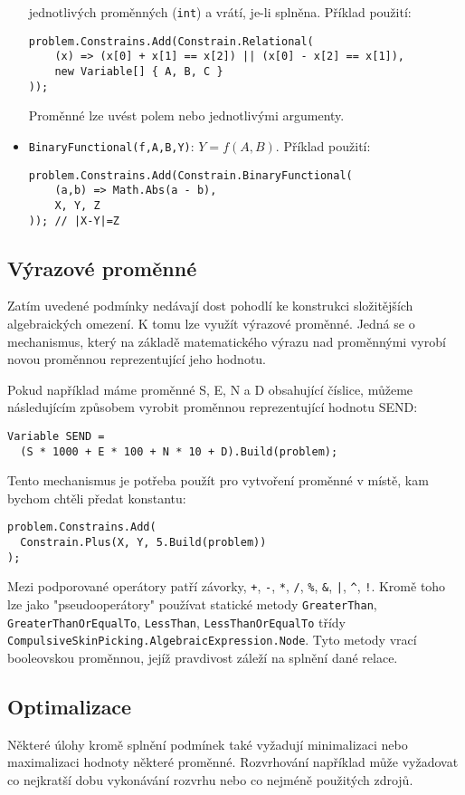 \documentclass[a4paper]{article}
\begin{document}
\begin{itemize}
	jednotlivých proměnných (\texttt{int}) a vrátí, je-li splněna.
	Příklad použití:
\begin{lstlisting}
problem.Constrains.Add(Constrain.Relational(
	(x) => (x[0] + x[1] == x[2]) || (x[0] - x[2] == x[1]),
	new Variable[] { A, B, C }
));
\end{lstlisting}
	Proměnné lze uvést polem nebo jednotlivými argumenty.
\item
	\texttt{BinaryFunctional(f,A,B,Y)}: $Y=f(A,B)$. Příklad použití:
\begin{lstlisting}
problem.Constrains.Add(Constrain.BinaryFunctional(
	(a,b) => Math.Abs(a - b),
	X, Y, Z
)); // |X-Y|=Z
\end{lstlisting}
\end{itemize}

\subsection{Výrazové proměnné}
Zatím uvedené podmínky nedávají dost pohodlí ke konstrukci složitějších
algebraických omezení. K tomu lze využít výrazové proměnné.
Jedná se o mechanismus, který na základě matematického výrazu nad proměnnými
vyrobí novou proměnnou reprezentující jeho hodnotu.

Pokud například máme proměnné S, E, N a D obsahující číslice, můžeme
následujícím způsobem vyrobit proměnnou reprezentující hodnotu SEND:
\begin{lstlisting}
Variable SEND =
  (S * 1000 + E * 100 + N * 10 + D).Build(problem);
\end{lstlisting}

Tento mechanismus je potřeba použít pro vytvoření proměnné v místě,
kam bychom chtěli předat konstantu:
\begin{lstlisting}
problem.Constrains.Add(
  Constrain.Plus(X, Y, 5.Build(problem))
);
\end{lstlisting}

Mezi podporované operátory patří závorky, \texttt{+}, \texttt{-}, \texttt{*},
\texttt{/}, \texttt{\%}, \texttt{\&}, \texttt{|}, \texttt{\^}, \texttt{!}.
Kromě toho lze jako "pseudooperátory" používat statické metody
\texttt{GreaterThan}, \texttt{GreaterThanOrEqualTo}, \texttt{LessThan},
\texttt{LessThanOrEqualTo} třídy
\texttt{CompulsiveSkinPicking.AlgebraicExpression.Node}. Tyto metody vrací
booleovskou proměnnou, jejíž pravdivost záleží na splnění dané relace.

\subsection{Optimalizace}
Některé úlohy kromě splnění podmínek také vyžadují minimalizaci nebo
maximalizaci hodnoty některé proměnné. Rozvrhování například může vyžadovat
co nejkratší dobu vykonávání rozvrhu nebo co nejméně použitých zdrojů.
\end{document}
